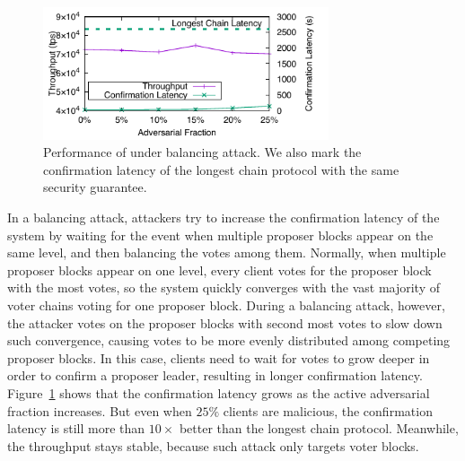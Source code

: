 \label{sec:balancing}

\begin{figure}
    \centering
    \includegraphics[width=0.75\textwidth]{figures/attack-fig-balancing.pdf}
    \caption{\small Performance of \prism under balancing attack. We also mark the confirmation latency of the longest chain protocol with the same security guarantee.}
    \label{fig:attack-balancing}
\end{figure}

In a balancing attack, attackers try to increase the confirmation latency of the system by waiting for the event when multiple proposer blocks appear on the same level, and then balancing the votes among them. Normally, when multiple proposer blocks appear on one level, every client votes for the proposer block with the most votes, so the system quickly converges with the vast majority of voter chains voting for one proposer block. During a balancing attack, however, the attacker votes on the proposer blocks with second most votes to slow down such convergence, causing votes to be more evenly distributed among competing proposer blocks. In this case, clients need to wait for votes to grow deeper in order to confirm a proposer leader, resulting in longer confirmation latency. Figure~\ref{fig:attack-balancing} shows that the confirmation latency grows as the active adversarial fraction increases. But even when $25\%$ clients are malicious, the confirmation latency is still more than $10\times$ better than the longest chain protocol. Meanwhile, the throughput stays stable, because such attack only targets voter blocks.

